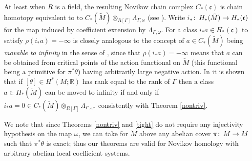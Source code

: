 \documentclass{amsart}
\theoremstyle{plain}
\theoremstyle{definition}
\theoremstyle{remark}
\def\co{\colon\thinspace}
\begin{document}
At least when $R$ is a field, the resulting Novikov chain complex $C_*(\mathfrak{c})$ is chain homotopy equivalent to to $C_*(\tilde{M})\otimes_{R[\Gamma]}\Lambda_{\Gamma,\omega}$ (see \cite{F}).  Write $i_*\co H_*(\tilde{M})\to H_*(\mathfrak{c})$ for the map induced by coefficient extension by $\Lambda_{\Gamma,\omega}$.   
  For a class $i_*a\in H_*(\mathfrak{c})$ to satisfy $\rho(i_*a)=-\infty$ is closely analogous to the concept of $a\in C_*(\tilde{M})$ being \emph{movable to infinity} in the sense of \cite{FS}, since that $\rho(i_*a)=-\infty$ means that $a$ can be obtained from critical points of the action functional on $\tilde{M}$ (this functional being a primitive for $\pi^*\theta$) having arbitrarily large negative action.  In \cite{FS} it is shown that if $[\theta]\in H^*(M;\mathbb{R})$ has rank equal to the rank of $\Gamma$ then a class $a\in H_*(\tilde{M})$  can be moved to infinity if and only if $i_*a=0\in C_*(\tilde{M})\otimes_{R[\Gamma]}\Lambda_{\Gamma,\omega}$, consistently with Theorem \ref{nontriv}.

We note that since Theorems \ref{nontriv} and \ref{tight} do not require any injectivity hypothesis on the map $\omega$, we can take for $\tilde{M}$ above any abelian cover $\pi\co \tilde{M}\to M$ such that $\pi^*\theta$ is exact; thus our theorems are valid for Novikov homology with arbitrary abelian local coefficient systems.
\end{document}
